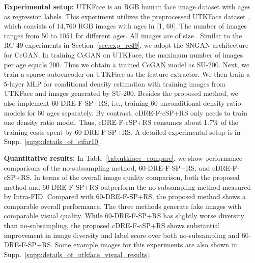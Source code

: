 \documentclass[10pt, twocolumn]{article}
\theoremstyle{definition}
\begin{document}
{\setlength{\parindent}{0cm}\textbf{Experimental setup:}} UTKFace is an RGB human face image dataset with ages as regression labels. This experiment utilizes the preprocessed UTKFace dataset \cite{ding2020continuous,ding2021ccgan}, which consists of 14,760 RGB images with ages in [1, 60]. The number of images ranges from 50 to 1051 for different ages. All images are of size . Similar to the RC-49 experiments in Section~\ref{sec:exp_rc49}, we adopt the SNGAN architecture \cite{miyato2018spectral} for CcGAN. In training CcGAN on UTKFace, the maximum number of images per age equals 200. Thus we obtain a trained CcGAN model as SU-200.  Next, we train a sparse autoencoder on UTKFace as the feature extractor. We then train a 5-layer MLP for conditional density estimation with training images from UTKFace and images generated by SU-200. Besides the proposed method, we also implement 60-DRE-F-SP+RS, i.e., training 60 unconditional density ratio models \cite{ding2020subsampling} for 60 ages separately. By contrast, cDRE-F-cSP+RS only needs to train one density ratio model. Thus, cDRE-F-cSP+RS consumes about 1.7\% of the training costs spent by 60-DRE-F-SP+RS. A detailed experimental setup is in Supp.\ \ref{supp:details_of_cifar10}.


{\setlength{\parindent}{0cm}\textbf{Quantitative results:}} In Table~\ref{tab:utkface_compare}, we show performance comparisons of the no-subsampling method, 60-DRE-F-SP+RS, and cDRE-F-cSP+RS. In terms of the overall image quality comparison, both the proposed method and 60-DRE-F-SP+RS outperform the no-subsampling method measured by Intra-FID. Compared with 60-DRE-F-SP+RS, the proposed method shows a comparable overall performance. The three methods generate fake images with comparable visual quality.  While 60-DRE-F-SP+RS has slightly worse diversity than no-subsampling, the proposed cDRE-F-cSP+RS shows substantial improvement in image diversity and label score over both no-subsampling and 60-DRE-F-SP+RS.  Some example images for this experiments are also shown in Supp.\ \ref{supp:details_of_utkface_visual_results}.
\end{document}
